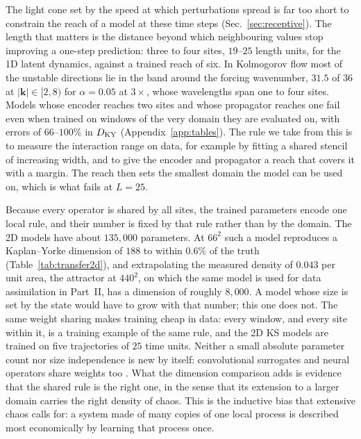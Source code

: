  The light cone set by
the speed at which perturbations spread is far too short to constrain the
reach of a model at these time steps (Sec.~\ref{sec:receptive}). The length
that matters is the distance beyond which neighbouring values stop
improving a one-step prediction: three to four sites, $19$--$25$ length
units, for the 1D latent dynamics, against a trained reach of six. In
Kolmogorov flow most of the unstable directions lie in the band around
the forcing wavenumber, $31.5$ of $36$ at $|\bm k|\in[2,8)$ for $\alpha=0.05$ at
$3\times$, whose wavelengths span one to four sites. Models whose encoder
reaches two sites and whose propagator reaches one fail even when trained
on windows of the very domain they are evaluated on, with errors of
$66$--$100\%$ in $D_{\mathrm{KY}}$ (Appendix~\ref{app:tables}). The rule we take from this
is to measure the interaction range on data, for example by fitting a
shared stencil of increasing width, and to give the encoder and
propagator a reach that covers it with a margin. The reach then sets the
smallest domain the model can be used on, which is what fails at $L=25$.

 Because every
operator is shared by all sites, the trained parameters encode one local
rule, and their number is fixed by that rule rather than by the domain.
The 2D models have about $135{,}000$ parameters. At $66^2$ such a model
reproduces a Kaplan--Yorke dimension of $188$ to within $0.6\%$ of the truth
(Table~\ref{tab:transfer2d}), and extrapolating the measured density of
$0.043$ per unit area, the attractor at $440^2$, on which the same model is used
for data assimilation in Part~II, has a dimension of roughly $8{,}000$. A
model whose size is set by the state would have to grow with that number;
this one does not. The same weight sharing makes training cheap in data:
every window, and every site within it, is a training example of the same
rule, and the 2D KS models are trained on five trajectories of $25$ time
units. Neither a small absolute parameter count nor size independence is
new by itself: convolutional surrogates and neural operators share weights
too \citep{barsinai2019,kochkov2021}. What the dimension comparison adds is
evidence that the shared rule is the right one, in the sense that its
extension to a larger domain carries the right density of chaos. This is
the inductive bias that extensive chaos calls for: a system made of many
copies of one local process is described most economically by learning
that process once.

